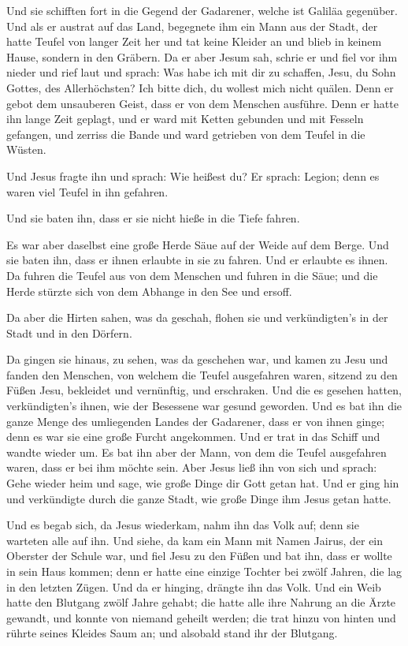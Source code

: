  Und sie schifften fort in die Gegend der Gadarener, welche
ist Galiläa gegenüber.  Und als er austrat auf das Land,
begegnete ihm ein Mann aus der Stadt, der hatte Teufel von langer Zeit
her und tat keine Kleider an und blieb in keinem Hause, sondern in den
Gräbern.  Da er aber Jesum sah, schrie er und fiel vor ihm
nieder und rief laut und sprach: Was habe ich mit dir zu schaffen, Jesu,
du Sohn Gottes, des Allerhöchsten? Ich bitte dich, du wollest mich nicht
quälen.  Denn er gebot dem unsauberen Geist, dass er von
dem Menschen ausführe. Denn er hatte ihn lange Zeit geplagt, und er ward
mit Ketten gebunden und mit Fesseln gefangen, und zerriss die Bande und
ward getrieben von dem Teufel in die Wüsten.

 Und Jesus fragte ihn und sprach: Wie heißest du? Er
sprach: Legion; denn es waren viel Teufel in ihn gefahren.

 Und sie baten ihn, dass er sie nicht hieße in die Tiefe
fahren.

 Es war aber daselbst eine große Herde Säue auf der Weide
auf dem Berge. Und sie baten ihn, dass er ihnen erlaubte in sie zu
fahren. Und er erlaubte es ihnen.  Da fuhren die Teufel aus
von dem Menschen und fuhren in die Säue; und die Herde stürzte sich von
dem Abhange in den See und ersoff.

 Da aber die Hirten sahen, was da geschah, flohen sie und
verkündigten's in der Stadt und in den Dörfern.

 Da gingen sie hinaus, zu sehen, was da geschehen war, und
kamen zu Jesu und fanden den Menschen, von welchem die Teufel
ausgefahren waren, sitzend zu den Füßen Jesu, bekleidet und vernünftig,
und erschraken.  Und die es gesehen hatten, verkündigten's
ihnen, wie der Besessene war gesund geworden.  Und es bat
ihn die ganze Menge des umliegenden Landes der Gadarener, dass er von
ihnen ginge; denn es war sie eine große Furcht angekommen. Und er trat
in das Schiff und wandte wieder um.  Es bat ihn aber der
Mann, von dem die Teufel ausgefahren waren, dass er bei ihm möchte sein.
Aber Jesus ließ ihn von sich und sprach:  Gehe wieder heim
und sage, wie große Dinge dir Gott getan hat. Und er ging hin und
verkündigte durch die ganze Stadt, wie große Dinge ihm Jesus getan
hatte.

 Und es begab sich, da Jesus wiederkam, nahm ihn das Volk
auf; denn sie warteten alle auf ihn.  Und siehe, da kam ein
Mann mit Namen Jairus, der ein Oberster der Schule war, und fiel Jesu zu
den Füßen und bat ihn, dass er wollte in sein Haus kommen; 
denn er hatte eine einzige Tochter bei zwölf Jahren, die lag in den
letzten Zügen. Und da er hinging, drängte ihn das Volk. 
Und ein Weib hatte den Blutgang zwölf Jahre gehabt; die hatte alle ihre
Nahrung an die Ärzte gewandt, und konnte von niemand geheilt werden;
 die trat hinzu von hinten und rührte seines Kleides Saum
an; und alsobald stand ihr der Blutgang.

